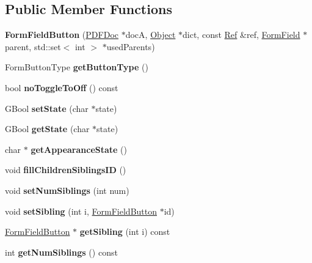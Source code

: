 \subsection*{Public Member Functions}
\begin{DoxyCompactItemize}
\item 
\mbox{\label{class_form_field_button_a1f392676c8e60c82e4bddf67da545c9d}} 
{\bfseries Form\+Field\+Button} (\hyperlink{class_p_d_f_doc}{P\+D\+F\+Doc} $\ast$docA, \hyperlink{class_object}{Object} $\ast$dict, const \hyperlink{struct_ref}{Ref} \&ref, \hyperlink{class_form_field}{Form\+Field} $\ast$parent, std\+::set$<$ int $>$ $\ast$used\+Parents)
\item 
\mbox{\label{class_form_field_button_a06a9b0b95d52ac6912f2f5409f6cd65c}} 
Form\+Button\+Type {\bfseries get\+Button\+Type} ()
\item 
\mbox{\label{class_form_field_button_aaca7396d29bc674d85a022d6804cd1cb}} 
bool {\bfseries no\+Toggle\+To\+Off} () const
\item 
\mbox{\label{class_form_field_button_a452939f99d353a38a7fbca922feef166}} 
G\+Bool {\bfseries set\+State} (char $\ast$state)
\item 
\mbox{\label{class_form_field_button_a4c5da036394621803fdb01c39ab74905}} 
G\+Bool {\bfseries get\+State} (char $\ast$state)
\item 
\mbox{\label{class_form_field_button_a663b42c8c10a94a445119f946f1a77fa}} 
char $\ast$ {\bfseries get\+Appearance\+State} ()
\item 
\mbox{\label{class_form_field_button_ae34a14ff292bf8527859f58149942c7b}} 
void {\bfseries fill\+Children\+Siblings\+ID} ()
\item 
\mbox{\label{class_form_field_button_ac8154e9c50d1389aa5b06b56f23fc93b}} 
void {\bfseries set\+Num\+Siblings} (int num)
\item 
\mbox{\label{class_form_field_button_ad859965a3f1507aa99de86460439663e}} 
void {\bfseries set\+Sibling} (int i, \hyperlink{class_form_field_button}{Form\+Field\+Button} $\ast$id)
\item 
\mbox{\label{class_form_field_button_ad9fd0daf1043e98f8171294b9f48abd7}} 
\hyperlink{class_form_field_button}{Form\+Field\+Button} $\ast$ {\bfseries get\+Sibling} (int i) const
\item 
\mbox{\label{class_form_field_button_a2cbd239d3299524948f46e67ca7c7fdb}} 
int {\bfseries get\+Num\+Siblings} () const
\end{DoxyCompactItemize}
